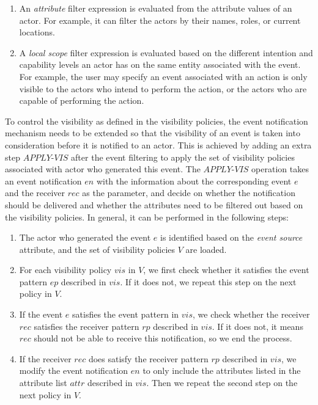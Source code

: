 \begin{enumerate}
	\item An \emph{attribute} filter expression is evaluated from the attribute values of an actor. For example, it can filter the actors by their names, roles, or current locations.
	\item A \emph{local scope} filter expression is evaluated based on the different intention and capability levels an actor has on the same entity associated with the event. For example, the user may specify an event associated with an action is only visible to the actors who intend to perform the action, or the actors who are capable of performing the action.
\end{enumerate}

To control the visibility as defined in the visibility policies, the event notification mechanism needs to be extended so that the visibility of an event is taken into consideration before it is notified to an actor. This is achieved by adding an extra step $APPLY\textrm{-}VIS$ after the event filtering to apply the set of visibility policies associated with actor who generated this event. The $APPLY\textrm{-}VIS$ operation takes an event notification $en$ with the information about the corresponding event $e$ and the receiver $rec$ as the parameter, and decide on whether the notification should be delivered and whether the attributes need to be filtered out based on the visibility policies. In general, it can be performed in the following steps:

\begin{enumerate}
	\item The actor who generated the event $e$ is identified based on the \emph{event source} attribute, and the set of visibility policies $V$ are loaded. 
	\item For each visibility policy $vis$ in $V$, we first check whether it satisfies the event pattern $ep$ described in $vis$. If it does not, we repeat this step on the next policy in $V$.
	\item If the event $e$ satisfies the event pattern in $vis$, we check whether the receiver $rec$ satisfies the receiver pattern $rp$ described in $vis$. If it does not, it means $rec$ should not be able to receive this notification, so we end the process.
	\item If the receiver $rec$ does satisfy the receiver pattern $rp$ described in $vis$, we modify the event notification $en$ to only include the attributes listed in the attribute list $attr$ described in $vis$. Then we repeat the second step on the next policy in $V$.
\end{enumerate}

